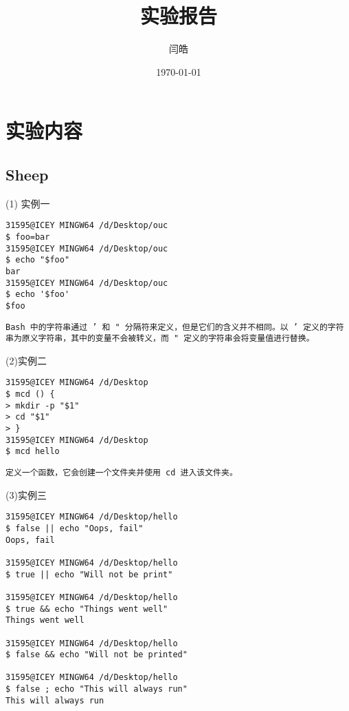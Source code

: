\documentclass[a4paper, 12pt]{article}
\begin{document}
\title{实验报告}
\author{闫皓}
\date{\today}
\maketitle

\tableofcontents
\newpage
{}

\section{实验内容}
\subsection{Sheep}
(1) 实例一
\begin{Verbatim}
31595@ICEY MINGW64 /d/Desktop/ouc
$ foo=bar
31595@ICEY MINGW64 /d/Desktop/ouc
$ echo "$foo"
bar
31595@ICEY MINGW64 /d/Desktop/ouc
$ echo '$foo'
$foo
\end{Verbatim}

\texttt{{\color{blue}Bash 中的字符串通过 ' 和 " 分隔符来定义，但是它们的含义并不相同。以 ' 定义的字符串为原义字符串，其中的变量不会被转义，而 " 定义的字符串会将变量值进行替换。} }

(2)实例二
\begin{Verbatim}
31595@ICEY MINGW64 /d/Desktop
$ mcd () {
> mkdir -p "$1"
> cd "$1"
> }
31595@ICEY MINGW64 /d/Desktop
$ mcd hello
\end{Verbatim}

\texttt{{\color{blue}定义一个函数，它会创建一个文件夹并使用 cd 进入该文件夹。}}

(3)实例三
\begin{Verbatim}
31595@ICEY MINGW64 /d/Desktop/hello
$ false || echo "Oops, fail"
Oops, fail

31595@ICEY MINGW64 /d/Desktop/hello
$ true || echo "Will not be print"

31595@ICEY MINGW64 /d/Desktop/hello
$ true && echo "Things went well"
Things went well

31595@ICEY MINGW64 /d/Desktop/hello
$ false && echo "Will not be printed"

31595@ICEY MINGW64 /d/Desktop/hello
$ false ; echo "This will always run"
This will always run
\end{Verbatim}
\end{document}
